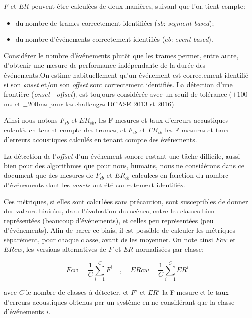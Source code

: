 $F$ et $ER$ peuvent être calculées de deux manières, suivant que l'on tient compte: 

\begin{itemize}
\item du nombre de trames correctement identifiées ($sb$: \emph{segment based});
\item du nombre d'événements correctement identifiés ($eb$: \emph{event based}).
\end{itemize}

Considérer le nombre d'événements plutôt que les trames permet, entre autre, d'obtenir une mesure de performance indépendante de la durée des événements.On estime habituellement qu'un événement est correctement identifié si son \emph{onset} et/ou son \emph{offset} sont correctement identifiés. La détection d'une frontière (\emph{onset} - \emph{offset}), est toujours considérée avec un seuil de tolérance ($\pm100$ms et $\pm200$ms pour les challenges DCASE 2013 et 2016).

Ainsi nous notons $F_{sb}$ et $ER_{sb}$, les F-mesures et taux d'erreurs acoustiques calculés en tenant compte des trames, et $F_{eb}$ et $ER_{eb}$ les F-mesures et taux d'erreurs acoustiques calculés en tenant compte des événements.

La détection de l'\emph{offset} d'un événement sonore restant une tâche difficile, aussi bien pour des algorithmes que pour nous, humains, nous ne considérons dans ce document que des mesures de $F_{eb}$ et $ER_{eb}$ calculées en fonction du nombre d'événements dont les \emph{onsets} ont été correctement identifiés.

Ces métriques, si elles sont calculées sans précaution, sont susceptibles de donner des valeurs biaisées, dans l'évaluation des scènes, entre les classes bien représentées (beaucoup d'événements), et celles peu représentées (peu d'événements). Afin de parer ce biais, il est possible de calculer les métriques séparément, pour chaque classe, avant de les moyenner. On note ainsi $Fcw$ et $ERcw$, les versions alternatives de $F$ et $ER$ normalisées par classe:

\begin{equation}
\label{eq:ch7_eq3}
Fcw=\dfrac{1}{C}\sum_{i=1}^C F^i \quad \textrm{, } \quad ERcw=\dfrac{1}{C}\sum_{i=1}^C ER^i
\end{equation}

avec $C$ le nombre de classes à détecter, et $F^i$ et $ER^i$ la F-mesure et le taux d'erreurs acoustiques obtenus par un système en ne considérant que la classe d'événements $i$. 

